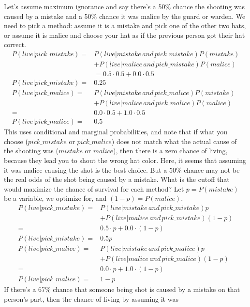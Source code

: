 \documentclass[10pt]{article}
\begin{document}
Let's assume maximum ignorance and 
say there's a 50\% chance the shooting was caused by a mistake and a 50\% 
chance it was malice by the guard or warden. We need to pick a method: assume 
it is a mistake and pick one of the other two hats, or assume it is malice and 
choose your hat as if the previous person got their hat correct.
\begin{align*}
    P(live|pick\_mistake) = &P(live|mistake\,and\,pick\_mistake)P(mistake) \\
        &+ P(live|malice\,and\,pick\_mistake)P(malice) \\
    &= 0.5\cdot0.5 + 0.0\cdot0.5 \\
    P(live|pick\_mistake) = &0.25 \\
    P(live|pick\_malice) = &P(live|mistake\,and\,pick\_malice)P(mistake) \\
        &+ P(live|malice\,and\,pick\_malice)P(malice) \\
    = &0.0\cdot0.5 + 1.0\cdot0.5 \\
    P(live|pick\_malice) = &0.5
\end{align*}
This uses conditional and marginal probabilities, and note that if what you 
choose ($pick\_mistake$ or $pick\_malice$) does not match what the actual 
cause of the shooting was ($mistake$ or $malice$), then there is a zero chance 
of living, because they lead you to shout the wrong hat color.
Here, it seems that assuming it was malice causing the shot is the best choice.
But a 50\% chance may not be the real odds of the shot being caused by 
a mistake. What is the cutoff that would maximize the chance of survival for 
each method? Let $p = P(mistake)$ be a variable, we optimize for, and 
$(1-p) = P(malice)$.
\begin{align*}
    P(live|pick\_mistake) =&P(live|mistake\,and\,pick\_mistake)p \\
        &+ P(live|malice\,and\,pick\_mistake)(1-p) \\
    =&0.5\cdot p + 0.0\cdot(1-p) \\
    P(live|pick\_mistake) = &0.5p \\
    P(live|pick\_malice) = &P(live|mistake\,and\,pick\_malice)p \\
        &+ P(live|malice\,and\,pick\_malice)(1-p) \\
    = &0.0\cdot p + 1.0\cdot(1-p) \\
    P(live|pick\_malice) = &1-p
\end{align*}
If there's a 67\% chance that someone being shot is caused by a mistake 
on that person's part, then the chance of living by assuming it was 
\end{document}
